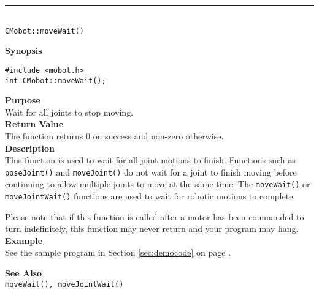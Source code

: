 \noindent
\vspace{5pt}
\rule{4.5in}{0.015in}\\
\noindent
{\LARGE \texttt{CMobot::moveWait()}}\\
{}

\noindent
{\bf Synopsis}\\
\begin{verbatim}
#include <mobot.h>
int CMobot::moveWait();
\end{verbatim}

\noindent
{\bf Purpose}\\
Wait for all joints to stop moving.\\

\noindent
{\bf Return Value}\\
The function returns 0 on success and non-zero otherwise.\\

\noindent
{\bf Description}\\
This function is used to wait for all joint motions to finish. Functions such as
\texttt{poseJoint()} and \texttt{moveJoint()} do not wait for a joint to finish
moving before continuing to allow multiple joints to move at the same time. The
\texttt{moveWait()} or \texttt{moveJointWait()} functions are used to wait for
robotic motions to complete.

Please note that if this function is called after a motor has been commanded to
turn indefinitely, this function may never return and your program may hang.\\

\noindent
{\bf Example}\\
See the sample program in Section \ref{sec:democode} on page \pageref{sec:democode}.
\noindent

\noindent
{\bf See Also}\\
\texttt{moveWait(), moveJointWait()}

